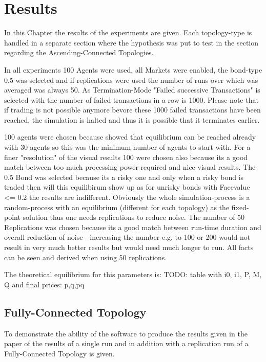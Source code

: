 \documentclass[Bachelorarbeit.tex]{subfiles}
\begin{document}
\chapter{Results}

In this Chapter the results of the experiments are given. Each topology-type is handled in a separate section where the hypothesis was put to test in the section regarding the Ascending-Connected Topologies.

In all experiments 100 Agents were used, all Markets were enabled, the bond-type 0.5 was selected and if replications were used the number of runs over which was averaged was always 50.
As Termination-Mode "Failed successive Transactions" is selected with the number of failed transactions in a row is 1000. Please note that if trading is not possible anymore bevore these 1000 failed transactions have been reached, the simulation is halted and thus it is possible that it terminates earlier.

100 agents were chosen because \cite{Breuer2015} showed that equilibrium can be reached already with 30 agents so this was the minimum number of agents to start with. For a finer "resolution" of the visual results 100 were chosen also because its a good match between too much processing power required and nice visual results.
The 0.5 Bond was selected because its a risky one and only when a risky bond is traded then will this equilibirum show up as for unrisky bonds with Facevalue <= 0.2 the results are indifferent.
Obviously the whole simulation-process is a random-process with an equilibrium (different for each topology) as the fixed-point solution thus one needs replications to reduce noise. The number of 50 Replications was chosen because its a good match between run-time duration and overall reduction of noise - increasing the number e.g. to 100 or 200 would not result in very much better results but would need much longer to run. All facts can be seen and derived when using 50 replications.

The theoretical equilibrium for this parameters is:
TODO: table with i0, i1, P, M, Q and final prices: p,q,pq

\section{Fully-Connected Topology}
To demonstrate the ability of the software to produce the results given in the paper of \cite{Breuer2015} the results of a single run and in addition with a replication run of a Fully-Connected Topology is given.
\end{document}
